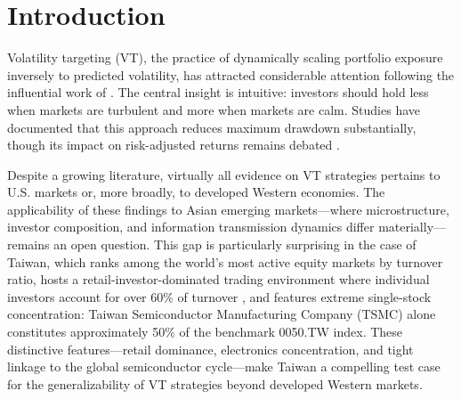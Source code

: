 
\section{Introduction}
\label{sec:intro}

Volatility targeting (VT), the practice of dynamically scaling portfolio exposure inversely to predicted volatility, has attracted considerable attention following the influential work of \citet{moreira2017}. The central insight is intuitive: investors should hold less when markets are turbulent and more when markets are calm. Studies have documented that this approach reduces maximum drawdown substantially, though its impact on risk-adjusted returns remains debated \citep{fleming2001,harvey2018}.

Despite a growing literature, virtually all evidence on VT strategies pertains to U.S. markets or, more broadly, to developed Western economies. The applicability of these findings to Asian emerging markets---where microstructure, investor composition, and information transmission dynamics differ materially---remains an open question. This gap is particularly surprising in the case of Taiwan, which ranks among the world's most active equity markets by turnover ratio, hosts a retail-investor-dominated trading environment where individual investors account for over 60\% of turnover \citep{barber2009}, and features extreme single-stock concentration: Taiwan Semiconductor Manufacturing Company (TSMC) alone constitutes approximately 50\% of the benchmark 0050.TW index. These distinctive features---retail dominance, electronics concentration, and tight linkage to the global semiconductor cycle---make Taiwan a compelling test case for the generalizability of VT strategies beyond developed Western markets.

